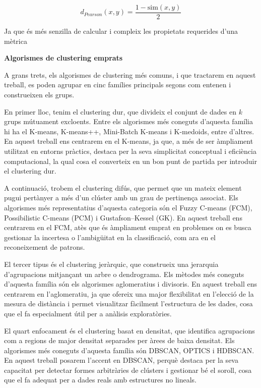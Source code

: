 \documentclass[a4paper,12pt]{report}
\begin{document}
\[
d_{Pearson}(x,y) = \frac{1 - \text{sim}(x,y)}{2}
\]

Ja que és més senzilla de calcular i compleix les propietats requerides d’una mètrica

\vspace{0.5cm}
\textbf{Algorismes de clustering emprats}

A grans trets, els algorismes de clustering més comuns, i que tractarem en aquest treball, es poden agrupar en cinc famílies principals segons com entenen i construeixen els grups. \cite{ezugwu2022comprehensive}

En primer lloc, tenim el clustering dur, que divideix el conjunt de dades en $k$ grups mútuament excloents. Entre els algorismes més coneguts d’aquesta família hi ha el K-means, K-means++, Mini-Batch K-means i K-medoids, entre d'altres. En aquest treball ens centrarem en el K-means, ja que, a més de ser àmpliament utilitzat en entorns pràctics, destaca per la seva simplicitat conceptual i eficiència computacional, la qual cosa el converteix en un bon punt de partida per introduir el clustering dur.

A continuació, trobem el clustering difús, que permet que un mateix element pugui pertànyer a més d’un clúster amb un grau de pertinença associat. Els algorismes més representatius d’aquesta categoria són el Fuzzy C-means (FCM), Possibilistic C-means (PCM) i Gustafson–Kessel (GK). En aquest treball ens centrarem en el FCM, atès que és àmpliament emprat en problemes on es busca gestionar la incertesa o l’ambigüitat en la classificació, com ara en el reconeixement de patrons.

El tercer tipus és el clustering jeràrquic, que construeix una jerarquia d’agrupacions mitjançant un arbre o dendrograma. Els mètodes més coneguts d’aquesta família són els algorismes aglomeratius i divisoris. En aquest treball ens centrarem en l’aglomeratiu, ja que ofereix una major flexibilitat en l'elecció de la mesura de distància i permet visualitzar fàcilment l’estructura de les dades, cosa que el fa especialment útil per a anàlisis exploratòries.

El quart enfocament és el clustering basat en densitat, que identifica agrupacions com a regions de major densitat separades per àrees de baixa densitat. Els algorismes més coneguts d’aquesta família són DBSCAN, OPTICS i HDBSCAN. En aquest treball posarem l’accent en DBSCAN, perquè destaca per la seva capacitat per detectar formes arbitràries de clústers i gestionar bé el soroll, cosa que el fa adequat per a dades reals amb estructures no lineals.
\end{document}
